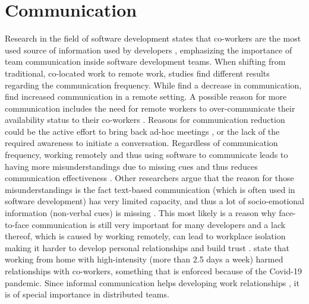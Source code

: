 \section{Communication}
Research in the field of software development states that co-workers are the most used source of information used by developers \autocite{ko2007information}, emphasizing the importance of team communication inside software development teams. When shifting from traditional, co-located work to remote work, studies find different results regarding the communication frequency. While \textcite{kraut1988patterns, allen1984managing} find a decrease in communication, \textcite{mulki2009set} find increased communication in a remote setting. A possible reason for more communication includes the need for remote workers to over-communicate their availability status to their co-workers \autocite{koehne2012remote}. Reasons for communication reduction could be the active effort to bring back ad-hoc meetings \autocite{miller2021your}, or the lack of the required awareness to initiate a conversation. Regardless of communication frequency, working remotely and thus using software to communicate leads to having more misunderstandings due to missing cues and thus reduces communication effectiveness \autocite{mulki2009set}. Other researchers argue that the reason for those misunderstandings is the fact text-based communication (which is often used in software development) has very limited capacity, and thus a lot of socio-emotional information (non-verbal cues) is missing \autocite{hassib2017heartchat}. This most likely is a reason why face-to-face communication is still very important for many developers \autocite{storey2016social} and a lack thereof, which is caused by working remotely, can lead to workplace isolation making it harder to develop personal relationships and build trust \autocite{mulki2009set}. \textcite{gajendran2007good} state that working from home with high-intensity (more than 2.5 days a week) harmed relationships with co-workers, something that is enforced because of the Covid-19 pandemic. Since informal communication helps developing work relationships \autocite{comella2020revisiting, olson2006bridging}, it is of special importance in distributed teams.


